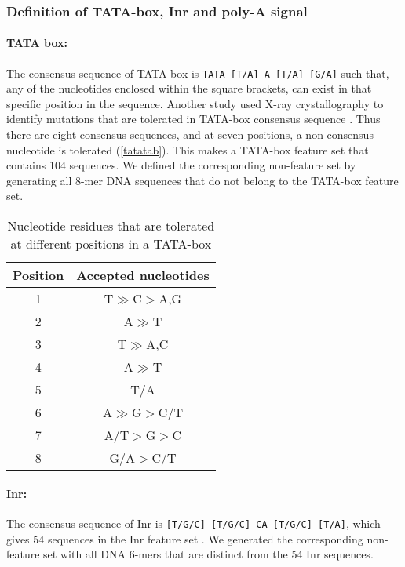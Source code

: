 \documentclass[12pt,a4paper]{article}
\begin{document}
\subsubsection{Definition of TATA-box, Inr and poly-A signal}

\paragraph{TATA box:}

The consensus sequence of TATA-box is \texttt{TATA [T/A] A [T/A] [G/A]} \citep{tata2} such that, any of the nucleotides enclosed within the square brackets, can exist in that specific position in the sequence. Another study used X-ray crystallography to identify mutations that are tolerated in TATA-box consensus sequence \citep{tata1}. Thus there are eight consensus sequences, and at seven positions, a non-consensus nucleotide is tolerated (\autoref{tatatab}). This makes a TATA-box feature set that contains 104 sequences. We defined the corresponding non-feature set by generating all 8-mer DNA sequences that do not belong to the TATA-box feature set.

\begin{table}[!t]
\centering
\begin{tabular}{c c}
\toprule
Position  & Accepted nucleotides \\ \midrule
1         & T$\gg$C$>$A,G        \\ \midrule
2         & A$\gg$T               \\ \midrule
3         & T$\gg$A,C             \\ \midrule
4         & A$\gg$T               \\ \midrule
5         & T/A                   \\ \midrule
6         & A$\gg$G$>$C/T         \\ \midrule
7         & A/T$>$G$>$C           \\ \midrule
8         & G/A$>$C/T             \\ \bottomrule
\end{tabular}
\caption{Nucleotide residues that are tolerated at different positions in a TATA-box \citep[based on][]{tata1}}
\label{tatatab}
\end{table}


\paragraph{Inr:} The consensus sequence of Inr is \texttt{[T/G/C] [T/G/C] CA [T/G/C] [T/A]}, which gives 54 sequences in the Inr feature set \citep{Inr}. We generated the corresponding non-feature set with all DNA 6-mers that are distinct from the 54 Inr sequences.
\end{document}
